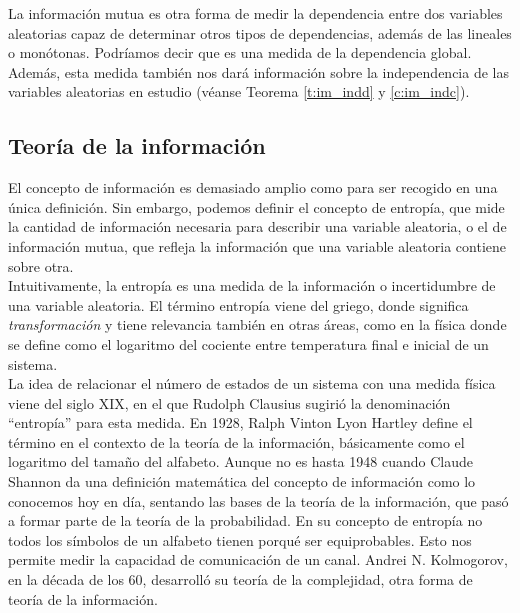 \documentclass[10pt,a4paper]{article} %
\theoremstyle{definition}
\begin{document}
La información mutua es otra forma de medir la dependencia entre dos variables aleatorias capaz de determinar otros tipos de dependencias, además de las lineales o monótonas. Podríamos decir que es una medida de la dependencia global. Además, esta medida también nos dará información sobre la independencia de las variables aleatorias en estudio (véanse Teorema \ref{t:im_indd} y \ref{c:im_indc}).

    \subsection{Teoría de la información}

    El concepto de información es demasiado amplio como para ser recogido en una única definición. Sin embargo, podemos definir el concepto de entropía, que mide la cantidad de información necesaria para describir una variable aleatoria, o el de información mutua, que refleja la información que una variable aleatoria contiene sobre otra.\\

    Intuitivamente, la entropía es una medida de la información o incertidumbre de una variable aleatoria. El término entropía viene del griego, donde significa \textit{transformación} y tiene relevancia también en otras áreas, como en la física donde se define como el logaritmo del cociente entre temperatura final e inicial de un sistema.\\

    La idea de relacionar el número de estados de un sistema con una medida física viene del siglo XIX, en el que Rudolph Clausius sugirió la denominación ``entropía'' para esta medida. En 1928, Ralph Vinton Lyon Hartley define el término en el contexto de la teoría de la información, básicamente como el logaritmo del tamaño del alfabeto. Aunque no es hasta 1948 cuando Claude Shannon da una definición matemática del concepto de información como lo conocemos hoy en día,  sentando las bases de la teoría de la información, que pasó a formar parte de la teoría de la probabilidad. En su concepto de entropía no todos los símbolos de un alfabeto tienen porqué ser equiprobables. Esto nos permite medir la capacidad de comunicación de un canal. Andrei N. Kolmogorov, en la década de los 60, desarrolló su teoría de la complejidad, otra forma de teoría de la información.\\
\end{document}
